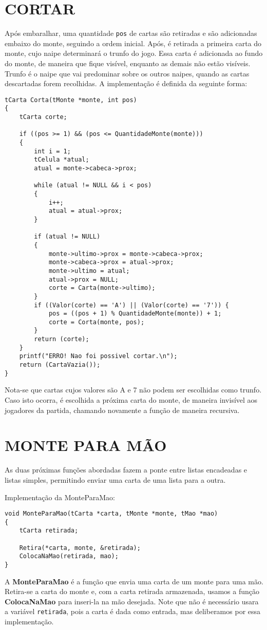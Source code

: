 \documentclass[12pt, oneside, a4paper, brazil]{abntex2}
\begin{document}
\section{CORTAR} \label{se:cortar}

Após embaralhar, uma quantidade \texttt{pos} de cartas são retiradas e são adicionadas embaixo do monte, seguindo a ordem inicial. Após, é retirada a primeira carta do monte, cujo naipe determinará o trunfo do jogo. Essa carta é adicionada ao fundo do monte, de maneira que fique visível, enquanto as demais não estão visíveis. Trunfo é o naipe que vai predominar sobre os outros naipes, quando as cartas descartadas forem recolhidas. A implementação é definida da seguinte forma:

\begin{lstlisting}
tCarta Corta(tMonte *monte, int pos)
{
    tCarta corte;

    if ((pos >= 1) && (pos <= QuantidadeMonte(monte)))
    {
        int i = 1;
        tCelula *atual;
        atual = monte->cabeca->prox;

        while (atual != NULL && i < pos)
        {
            i++;
            atual = atual->prox;
        }

        if (atual != NULL)
        {
            monte->ultimo->prox = monte->cabeca->prox;
            monte->cabeca->prox = atual->prox;
            monte->ultimo = atual;
            atual->prox = NULL;
            corte = Carta(monte->ultimo);
        }
        if ((Valor(corte) == 'A') || (Valor(corte) == '7')) {
            pos = ((pos + 1) % QuantidadeMonte(monte)) + 1;
            corte = Corta(monte, pos);
        }
        return (corte);
    }
    printf("ERRO! Nao foi possivel cortar.\n");
    return (CartaVazia());
}
\end{lstlisting}

Nota-se que cartas cujos valores são A e 7 não podem ser escolhidas como trunfo. Caso isto ocorra, é escolhida a próxima carta do monte, de maneira invisível aos jogadores da partida, chamando novamente a função de maneira recursiva.

\section{MONTE PARA MÃO}\label{se:implementaçãoMonteParaMao}
As duas próximas funções abordadas fazem a ponte entre listas encadeadas e listas simples, permitindo enviar uma carta de uma lista para a outra.

Implementação da MonteParaMao:
\begin{lstlisting}
void MonteParaMao(tCarta *carta, tMonte *monte, tMao *mao)
{
    tCarta retirada;

    Retira(*carta, monte, &retirada);
    ColocaNaMao(retirada, mao);
}
\end{lstlisting}
A \textbf{MonteParaMao} é a função que envia uma carta de um monte para uma mão. Retira-se a carta do monte e, com a carta retirada armazenada, usamos a função \textbf{ColocaNaMao} para inseri-la na mão desejada. Note que não é necessário usara a variável \texttt{retirada}, pois a carta é dada como entrada, mas deliberamos por essa implementação.
\end{document}
